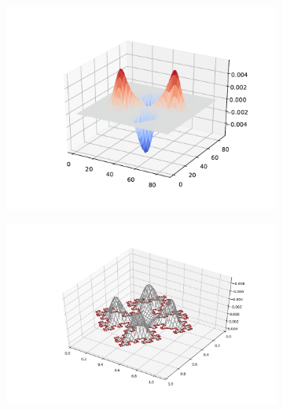 \documentclass{beamer}
\begin{document}
\begin{frame}
  \begin{figure}
    \begin{subfigure}[b]{0.49\textwidth}
      \includegraphics[width=\textwidth]{mode_4.pdf}
    \end{subfigure}
    \begin{subfigure}[b]{0.49\textwidth}
      \includegraphics[width=\textwidth]{wireframe_stylish.png}
    \end{subfigure}
  \end{figure}
\end{frame}
\end{document}
